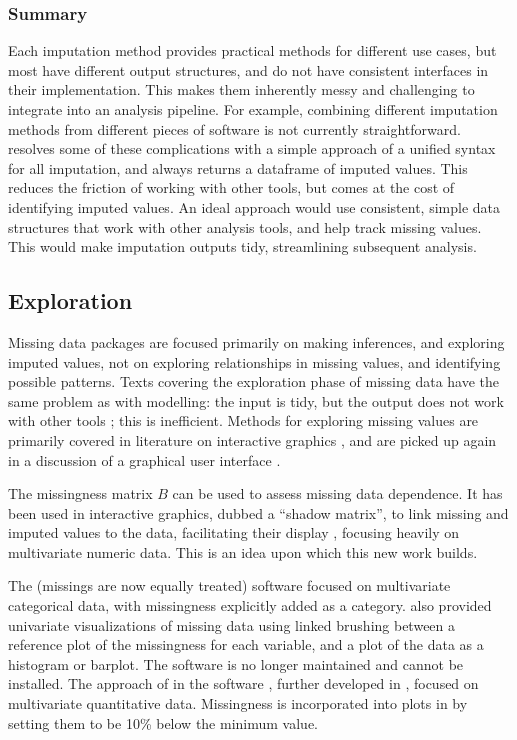 \documentclass[article]{jss}
\begin{document}
\hypertarget{imputation-summary}{%
\subsubsection{Summary}\label{imputation-summary}}

Each imputation method provides practical methods for different use cases,
but most have different output structures, and do not have consistent
interfaces in their implementation.  This makes them inherently messy and
challenging to integrate into an analysis pipeline.  For example, combining
different imputation methods from different pieces of software is not
currently straightforward.   resolves some of these
complications with a simple approach of a unified syntax for all imputation,
and always returns a dataframe of imputed values.  This reduces the friction
of working with other tools, but comes at the cost of identifying imputed
values.  An ideal approach would use consistent, simple data structures that
work with other analysis tools, and help track missing values.  This would
make imputation outputs tidy, streamlining subsequent analysis.

\hypertarget{exploration}{%
\subsection{Exploration}\label{exploration}}

Missing data packages are focused primarily on making inferences, and
exploring imputed values, not on exploring relationships in missing values,
and identifying possible patterns.  Texts covering the exploration phase of
missing data have the same problem as with modelling: the input is tidy, but
the output does not work with other tools \citep{vanBuuren2018}; this is
inefficient.  Methods for exploring missing values are primarily covered in
literature on interactive graphics \citep{Swayne1998, Unwin1996, Cook2007},
and are picked up again in a discussion of a graphical user interface
\citep{Cheng2015}.

The missingness matrix \(B\) can be used to assess missing data dependence.
It has been used in interactive graphics, dubbed a ``shadow matrix'', to
link missing and imputed values to the data, facilitating their display
\citep{Swayne1998}, focusing heavily on multivariate numeric data.  This is
an idea upon which this new work builds.

The  (missings are now equally treated) software
\citep{Unwin1996} focused on multivariate categorical data, with
missingness explicitly added as a category.   also provided
univariate visualizations of missing data using linked brushing between a
reference plot of the missingness for each variable, and a plot of the data
as a histogram or barplot.  The  software is no longer
maintained and cannot be installed.  The approach of \citep{Swayne1998} in
the software , further developed in 
\citep{Cook2007}, focused on multivariate quantitative data.  Missingness
is incorporated into plots in  by setting them to be 10\%
below the minimum value.
\end{document}
